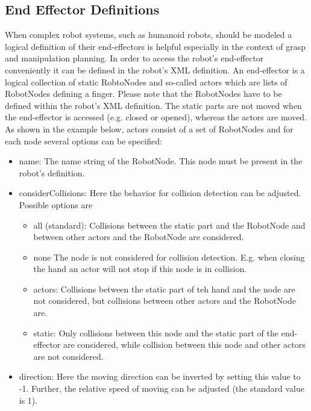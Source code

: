 \subsection{End Effector Definitions}
When complex robot systems, such as humanoid robots, should be modeled a logical definition of their end-effectors is helpful especially in the context of grasp and manipulation planning. In order to access the robot's end-effector conveniently it can be defined in the robot's XML definition. An end-effector is a logical collection of static RobtoNodes and so-called actors which are lists of RobotNodes defining a finger. Please note that the RobotNodes have to be defined within the robot's XML definition. The static parts are not moved when the end-effector is accessed (e.g. closed or opened), whereas the actors are moved. As shown in the example below, actors consist of a set of RobotNodes and for each node several options can be specified:
\begin{itemize}
  \item name: The name string of the RobotNode. This node must be present in the robot's definition. 
  \item considerCollisions: Here the behavior for collision detection can be adjusted. Possible options are 
  \begin{itemize}
    \item all (standard): Collisions between the static part and the RobotNode and between other actors and the RobotNode are considered. 
    \item none The node is not considered for collision detection. E.g. when closing the hand an actor will not stop if this node is in collision. 
    \item actors: Collisions between the static part of teh hand and the node are not considered, but collisions between other actors and the RobotNode are. 
    \item static: Only collisions between this node and the static part of the end-effector are considered, while collision between this node and other actors are not considered. 
  \end{itemize}

  \item direction: Here the moving direction can be inverted by setting this value to -1. Further, the relative speed of moving can be adjusted (the standard value is 1). 

\end{itemize}
